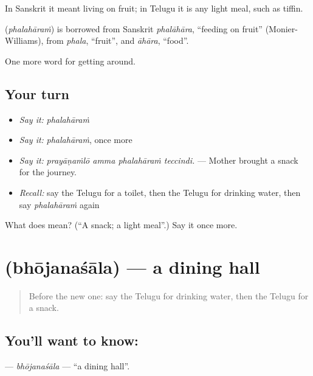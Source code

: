 In Sanskrit it meant living on fruit; in Telugu it is any light meal, such as tiffin.

\begin{cousinweb}
\textbf{} (\emph{phalahāraṁ}) is borrowed from Sanskrit \emph{phalāhāra}, \textquotedblleft{}feeding on fruit\textquotedblright{} (Monier-Williams), from \emph{phala}, \textquotedblleft{}fruit\textquotedblright{}, and \emph{āhāra}, \textquotedblleft{}food\textquotedblright{}.
\end{cousinweb}

\begin{grammarlens}[title={What you've built}]
One more word for getting around.
\end{grammarlens}

\subsection*{Your turn}
\begin{itemize}
\raggedright
  \item \emph{Say it:} \emph{phalahāraṁ}
  \item \emph{Say it:} \emph{phalahāraṁ}, once more
  \item \emph{Say it:} \emph{prayāṇaṁlō amma phalahāraṁ teccindi.} — Mother brought a snack for the journey.
  \item \emph{Recall:} say the Telugu for a toilet, then the Telugu for drinking water, then say \emph{phalahāraṁ} again
\end{itemize}

\begin{tcolorbox}[breakable,colback=teal!4,colframe=teal!35!black,title={Before you move on}]
What does  mean? (\textquotedblleft{}A snack; a light meal\textquotedblright{}.) Say it once more.
\end{tcolorbox}
\section[\texorpdfstring{\te{భోజనశాల} (bhōjanaśāla)}{భోజనశాల (bhōjanaśāla)}]{ (bhōjanaśāla) — a dining hall}

\label{lesson:TE-C459-bhojanasala}



\begin{quote}
Before the new one: say the Telugu for drinking water, then the Telugu for a snack.
\end{quote}

\subsection*{You'll want to know: }
\textbf{} — \emph{bhōjanaśāla} — \textquotedblleft{}a dining hall\textquotedblright{}.

